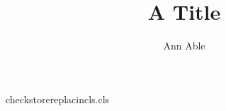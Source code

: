 \begin{filecontents*}[force]{checkstorereplacincls.cls}
\newcount\aucount
\def\author#1{\advance\aucount by 1 \gdef\@author{#1}}
\def\aex{}\def\viaex#1{\expandafter\gdef\expandafter\aex\expandafter{\aex #1\par}}
\def\atok{}\def\viatok#1{\toks@\expandafter{\atok #1\par}\xdef\atok{\the\toks@}}
\def\atmp{}\def\viatmp#1{\gdef\@tmpz{#1\par}\expandafter\g@addto@macro\expandafter\atmp\expandafter{\@tmpz}}
\def\vialet#1{\def\@tempa{#1}\global\let\alet\@tempa}
\def\onlylast#1{\gdef\alast{#1}}
\def\aapp{}\def\thenappend#1{\gdef\app@one{#1\par}\expandafter\g@addto@macro\expandafter\aapp\expandafter{\app@one}}
\def\twostores#1#2{\gdef\aone{#1}\gdef\atwo{#2}}
\renewcommand\maketitle{\par{\@title\par}\ifnum\aucount>0 {\@author\par}{\aex}{\atok}{\atmp}{\alet\par}{\alast\par}{\aapp}{\aone\par\atwo\par}\fi}
\end{filecontents*}
\documentclass{checkstorereplacincls}
\title{A Title}\author{Ann Able}
\maketitle
Body text.

